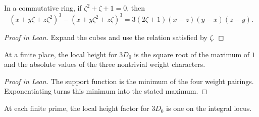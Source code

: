 \begin{supportinglemma}

\label{helper:cubicCharacters}


\leanok

In a commutative ring, if $\zeta^2+\zeta+1=0$, then \[(x+y\zeta+z\zeta^2)^3-(x+y\zeta^2+z\zeta)^3=3(2\zeta+1)(x-z)(y-x)(z-y).\]

\end{supportinglemma}

\begin{proof}[Proof in Lean]

\leanok

Expand the cubes and use the relation satisfied by $\zeta$.

\end{proof}

\begin{supportinglemma}

\label{helper:localWeightHeight}


\leanok

At a finite place, the local height for $3D_0$ is the square root of the maximum of $1$ and the absolute values of the three nontrivial weight characters.

\end{supportinglemma}

\begin{proof}[Proof in Lean]

\leanok

The support function is the minimum of the four weight pairings. Exponentiating turns this minimum into the stated maximum.

\end{proof}

\begin{supportinglemma}

\label{helper:integralLocalHeight}


\leanok

At each finite prime, the local height factor for $3D_0$ is one on the integral locus.

\end{supportinglemma}

